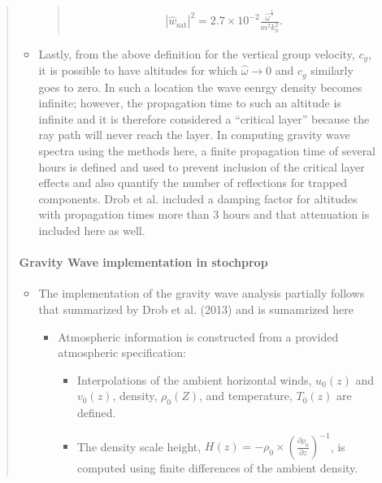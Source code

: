 \documentclass[letterpaper,10pt,english]{sphinxmanual}
\begin{document}
\begin{itemize}
\begin{quote}
\begin{itemize}
\begin{quote}
\begin{itemize}
\end{itemize}
\begin{equation*}
\begin{split}\left| \hat{w}_\text{sat} \right|^2 = 2.7 \times 10^{-2} \frac{\hat{\omega}^\frac{1}{3}}{m^2 k_h^2}.\end{split}
\end{equation*}\end{quote}

\item {} 
Lastly, from the above definition for the vertical group velocity, \(c_g\), it is possible to have altitudes for which \(\hat{\omega} \rightarrow 0\) and \(c_g\) similarly goes to zero.  In such a location the wave eenrgy density becomes infinite; however, the propagation time to such an altitude is infinite and it is therefore considered a “critical layer” because the ray path will never reach the layer.  In computing gravity wave spectra using the methods here, a finite propagation time of several hours is defined and used to prevent inclusion of the critical layer effects and also quantify the number of reflections for trapped components.  Drob et al. included a damping factor for altitudes with propagation times more than 3 hours and that attenuation is included here as well.

\end{itemize}


\paragraph{Gravity Wave implementation in stochprop}
\label{\detokenize{gravity:gravity-wave-implementation-in-stochprop}}\begin{itemize}
\item {} 
The implementation of the gravity wave analysis partially follows that summarized by Drob et al. (2013) and is sumamrized here
\begin{itemize}
\item {} 
Atmospheric information is constructed from a provided atmospheric specification:
\begin{itemize}
\item {} 
Interpolations of the ambient horizontal winds, \(u_0 \left( z \right)\) and \(v_0 \left( z \right)\), density, \(\rho_0 \left( Z \right)\), and temperature, \(T_0 \left( z \right)\) are defined.

\item {} 
The density scale height, \(H \left( z \right) = - \rho_0 \times \left( \frac{\partial \rho_0}{\partial z} \right)^{-1}\), is computed using finite differences of the ambient density.


\end{itemize}
\end{itemize}
\end{itemize}
\end{quote}
\end{itemize}
\end{document}
